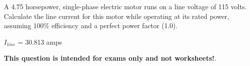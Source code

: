 

A 4.75 horsepower, single-phase electric motor runs on a line voltage of 115 volts.  Calculate the line current for this motor while operating at its rated power, assuming 100\% efficiency and a perfect power factor (1.0).







$I_{line}$ = 30.813 amps







{\bf This question is intended for exams only and not worksheets!}.


